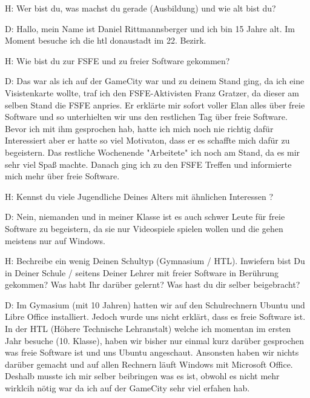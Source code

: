 H: Wer bist du, was machst du gerade (Ausbildung) und wie alt bist du?


D: Hallo, mein Name ist Daniel Rittmannsberger und ich bin 15 Jahre alt. Im Moment besuche ich die htl donaustadt im 22. Bezirk.





H: Wie bist du zur FSFE und zu freier Software gekommen?


D: Das war als ich auf der GameCity war und zu deinem Stand ging, da ich eine Visistenkarte wollte, traf ich den FSFE-Aktivisten
   Franz Gratzer, da dieser am selben Stand die FSFE anpries. Er erklärte mir sofort voller Elan alles über freie Software und so
   unterhielten wir uns den restlichen Tag über freie Software. Bevor ich mit ihm gesprochen hab, hatte ich mich noch nie
   richtig dafür Interessiert aber er hatte so viel Motivaton, dass er es schaffte mich dafür zu begeistern. Das restliche
   Wochenende "Arbeitete" ich noch am Stand, da es mir sehr viel Spaß machte. Danach ging ich zu den FSFE Treffen und
   informierte mich mehr über freie Software.





H: Kennst du viele Jugendliche Deines Alters mit ähnlichen Interessen ?


D: Nein, niemanden und in meiner Klasse ist es auch schwer Leute für freie Software zu begeistern, da sie nur Videospiele
   spielen wollen und die gehen meistens nur auf Windows.





H: Bechreibe ein wenig Deinen Schultyp (Gymnasium / HTL). Inwiefern bist Du in Deiner Schule / seitens Deiner Lehrer 
   mit freier Software in Berührung gekommen? Was habt Ihr darüber gelernt? Was hast du dir selber beigebracht?


D: Im Gymasium (mit 10 Jahren) hatten wir auf den Schulrechnern Ubuntu und Libre Office installiert. Jedoch wurde uns nicht
   erklärt, dass es freie Software ist.
   In der HTL (Höhere Technische Lehranstalt) welche ich momentan im ersten Jahr besuche (10. Klasse), haben wir bisher nur
   einmal kurz darüber gesprochen was freie Software ist und uns Ubuntu angeschaut. Ansonsten haben wir nichts darüber gemacht und auf
   allen Rechnern läuft Windows mit Microsoft Office. Deshalb musste ich mir selber beibringen was es ist, obwohl es nicht
   mehr wirklcih nötig war da ich auf der GameCity sehr viel erfahen hab.





